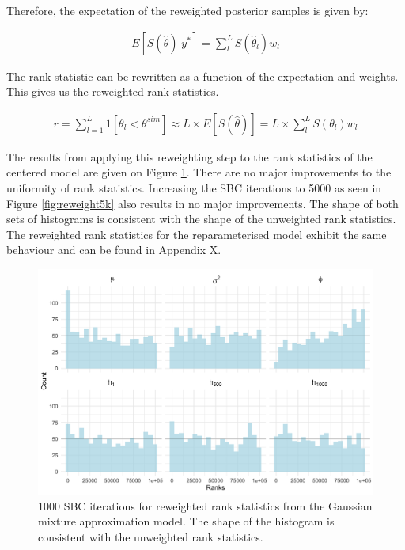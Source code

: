\documentclass[12pt, a4paper]{article}
\begin{document}
    Therefore, the expectation of the reweighted posterior samples is given by:

    $$
    \begin{aligned}
    E[S(\hat{\theta}) | y^{\ast}] = \sum_l^L S(\hat{\theta}_l)w_l
    \end{aligned}
    $$

    The rank statistic can be rewritten as a function of the expectation and weights. This gives us the reweighted rank statistics.

    $$
    \begin{aligned}
    r = \sum_{l=1}^{L}1[\theta_{l} < \theta^{sim}] \approx  L\times E[S(\hat{\theta})] = L\times \sum_l^L S(\theta_l)w_l
    \end{aligned}
    $$

    The results from applying this reweighting step to the rank statistics of the centered model are given on Figure \ref{fig:reweight1k}. There are no major improvements to the uniformity of rank statistics. Increasing the SBC iterations to 5000 as seen in Figure \ref{fig:reweight5k} also results in no major improvements. The shape of both sets of histograms is consistent with the shape of the unweighted rank statistics. The reweighted rank statistics for the reparameterised model exhibit the same behaviour and can be found in Appendix X. 

    \begin{figure}[H]
        \centering
        \includegraphics[scale=0.1]{results/sir_cp_1k.png}
        \caption{1000 SBC iterations for reweighted rank statistics from the Gaussian mixture approximation model. The shape of the histogram is consistent with the unweighted rank statistics.}
        \label{fig:reweight1k}
    \end{figure}
\end{document}
